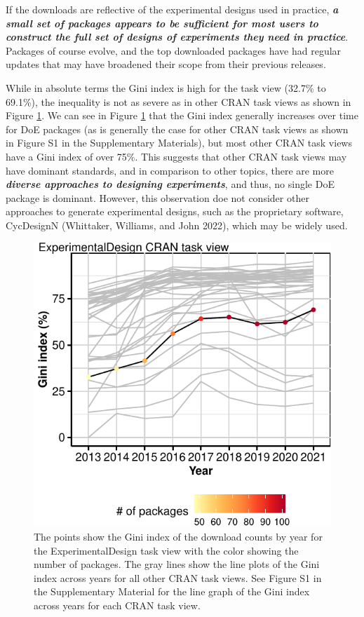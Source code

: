 If the downloads are reflective of the experimental designs used in practice, \textbf{\emph{a small set of packages appears to be sufficient for most users to construct the full set of designs of experiments they need in practice}}. Packages of course evolve, and the top downloaded packages have had regular updates that may have broadened their scope from their previous releases.

While in absolute terms the Gini index is high for the  task view (32.7\% to 69.1\%), the inequality is not as severe as in other CRAN task views as shown in Figure \ref{fig:fig-gini-all-ctvs}. We can see in Figure \ref{fig:fig-gini-all-ctvs} that the Gini index generally increases over time for DoE packages (as is generally the case for other CRAN task views as shown in Figure S1 in the Supplementary Materials), but most other CRAN task views have a Gini index of over 75\%. This suggests that other CRAN task views may have dominant standards, and in comparison to other topics, there are more \textbf{\emph{diverse approaches to designing experiments}}, and thus, no single DoE package is dominant. However, this observation doe not consider other approaches to generate experimental designs, such as the proprietary software, CycDesignN (Whittaker, Williams, and John 2022), which may be widely used.

\begin{figure}[htbp]

{\centering \includegraphics{figures/fig-gini-all-ctvs-1} 

}

\caption{The points show the Gini index of the download counts by year for the ExperimentalDesign task view with the color showing the number of packages. The gray lines show the line plots of the Gini index across years for all other CRAN task views. See Figure S1 in the Supplementary Material for the line graph of the Gini index across years for each CRAN task view.}\label{fig:fig-gini-all-ctvs}
\end{figure}

